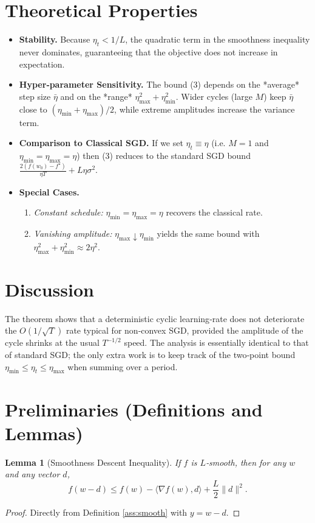 \documentclass{article}
\newtheorem{lemma}{Lemma}
\begin{document}
\section*{Theoretical Properties}
\begin{itemize}[leftmargin=*]
\item \textbf{Stability.} Because $\eta_{t}<1/L$, the quadratic term in the smoothness inequality never dominates, guaranteeing that the objective does not increase in expectation.
\item \textbf{Hyper‑parameter Sensitivity.} The bound (3) depends on the *average* step size $\bar\eta$ and on the *range* $\eta_{\max}^{2}+\eta_{\min}^{2}$. Wider cycles (large $M$) keep $\bar\eta$ close to $(\eta_{\min}+\eta_{\max})/2$, while extreme amplitudes increase the variance term.
\item \textbf{Comparison to Classical SGD.} If we set $\eta_{t}\equiv\eta$ (i.e. $M=1$ and $\eta_{\min}=\eta_{\max}=\eta$) then (3) reduces to the standard SGD bound $\frac{2(f(w_{0})-f^{\star})}{\eta T}+L\eta\sigma^{2}$.
\item \textbf{Special Cases.}
    \begin{enumerate}
        \item \emph{Constant schedule:} $\eta_{\min}=\eta_{\max}=\eta$ recovers the classical rate.
        \item \emph{Vanishing amplitude:} $\eta_{\max}\downarrow\eta_{\min}$ yields the same bound with $\eta_{\max}^{2}+\eta_{\min}^{2}\approx2\eta^{2}$.
    \end{enumerate}
\end{itemize}

\section*{Discussion}
The theorem shows that a deterministic cyclic learning‑rate does not deteriorate the $O(1/\sqrt{T})$ rate typical for non‑convex SGD, provided the amplitude of the cycle shrinks at the usual $T^{-1/2}$ speed. The analysis is essentially identical to that of standard SGD; the only extra work is to keep track of the two‑point bound $\eta_{\min}\le\eta_{t}\le\eta_{\max}$ when summing over a period.

\newpage

\section*{Preliminaries (Definitions and Lemmas)}
\begin{lemma}[Smoothness Descent Inequality]\label{lem:smooth}
If $f$ is $L$‑smooth, then for any $w$ and any vector $d$,
\[
f(w-d)\le f(w)-\langle\nabla f(w),d\rangle+\frac{L}{2}\|d\|^{2}.
\tag{L1}
\]
\end{lemma}
\begin{proof}
Directly from Definition \ref{ass:smooth} with $y=w-d$.
\end{proof}
\end{document}
